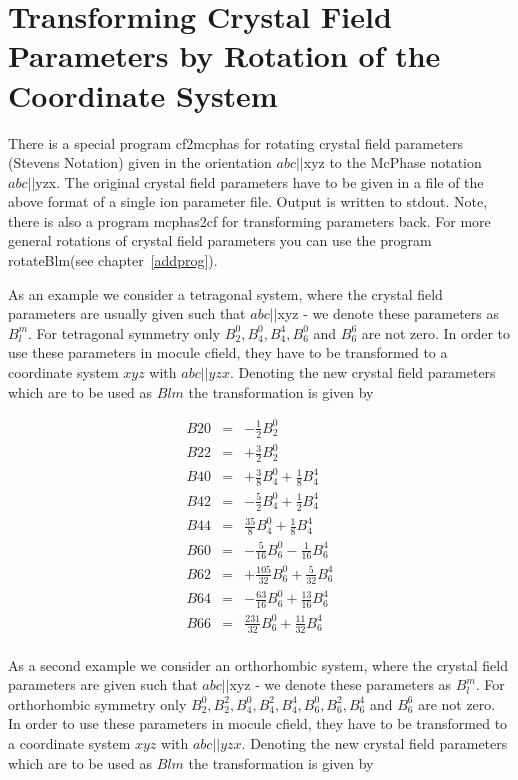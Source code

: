 \section{Transforming Crystal Field Parameters  by Rotation of the Coordinate %
System}\label{approtateBlm}

There is a special program {\prg cf2mcphas} for rotating crystal field parameters
(Stevens Notation) 
given in the orientation $abc||$xyz to the {\prg McPhase} notation $abc||$yzx. The 
original crystal field parameters have to be given in a file of the above format of a %
single
ion parameter file. Output is written to stdout. Note, there is also a program {\prg
mcphas2cf} for transforming parameters back. For more general rotations of 
crystal field parameters you can use the program {\prg rotateBlm}(see %
chapter~\ref{addprog}).

As an example we consider a tetragonal system, where the crystal field parameters
are usually given such that  $abc||$xyz - we denote these parameters as
 $B_l^m$. For tetragonal symmetry only $B_2^0, B_4^0, B_4^4, B_6^0$ and $B_6^6$ are
 not zero. In order to use these parameters in {\prg mocule cfield}, they 
 have to be transformed to a coordinate system $xyz$ with $abc||yzx$. Denoting the new
 crystal field parameters which are to be used as $Blm$ the transformation
 is given by 
 
\begin{eqnarray}
 B20&=&-\frac{1}{2} B_2^0  \nonumber \\  
 B22&=&+\frac{3}{2} B_2^0  \nonumber \\
 B40&=&+\frac{3}{8} B_4^0+\frac{1}{8} B_4^4     \nonumber \\
 B42&=&-\frac{5}{2} B_4^0+\frac{1}{2} B_4^4    \nonumber \\
 B44&=&\frac{35}{8} B_4^0+\frac{1}{8} B_4^4  \nonumber \\
 B60&=&-\frac{5}{16} B_6^0-\frac{1}{16} B_6^4  \nonumber \\
 B62&=&+\frac{105}{32} B_6^0+\frac{5}{32} B_6^4  \nonumber \\
 B64&=&-\frac{63}{16} B_6^0+\frac{13}{16} B_6^4  \nonumber \\
 B66&=&\frac{231}{32} B_6^0+\frac{11}{32} B_6^4  \nonumber \\
\end{eqnarray}

As a second example we consider an orthorhombic system, where the crystal field %
parameters
are given such that  $abc||$xyz - we denote these parameters as
 $B_l^m$. For orthorhombic symmetry only $B_2^0,B_2^2, B_4^0,B_4^2, B_4^4, B_6^0, B_6^2, %
B_6^4$ and $B_6^6$ are
 not zero. In order to use these parameters in {\prg mocule cfield}, they 
 have to be transformed to a coordinate system $xyz$ with $abc||yzx$. Denoting the new
 crystal field parameters which are to be used as $Blm$ the transformation
 is given by 
 
